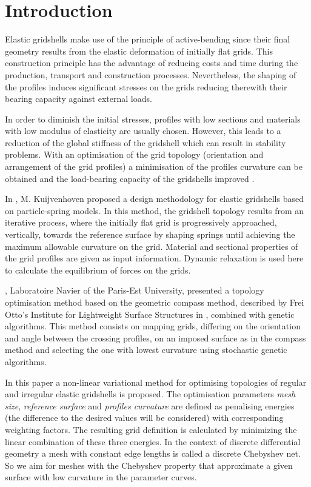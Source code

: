 
\section{Introduction}

Elastic gridshells make use of the principle of active-bending \cite{Alpermann2012} since their final geometry results from the elastic deformation of initially flat grids. This construction principle has the advantage of reducing costs and time during the production, transport and construction processes. Nevertheless, the shaping of the profiles induces significant stresses on the grids reducing therewith their bearing capacity against external loads.  

In order to diminish the initial stresses, profiles with low sections and materials with low modulus of elasticity are usually chosen. However, this leads to a reduction of the global stiffness of the gridshell which can result in stability problems. With an optimisation of the grid topology (orientation and arrangement of the grid profiles) a minimisation of the profiles curvature can be obtained and the load-bearing capacity of the gridshells improved \cite{Henandez2011}.  

In \cite{Kuijvenhoven2009}, M. Kuijvenhoven proposed a design methodology for elastic gridshells based on particle-spring models. In this method, the gridshell topology results from an iterative process, where the initially flat grid is progressively approached, vertically, towards the reference surface by shaping springs until achieving the maximum allowable curvature on the grid. Material and sectional properties of the grid profiles are given as input information. Dynamic relaxation is used here to calculate the equilibrium of forces on the grids. 

\cite{Bouhaya2011}, Laboratoire Navier of the Paris-Est University, presented a topology optimisation method based on the geometric compass method, described by Frei Otto's Institute for Lightweight Surface Structures in \cite{IL1974}, combined with genetic algorithms. This method consists on mapping grids, differing on the orientation and angle between the crossing profiles, on an imposed surface as in the compass method and selecting the one with lowest curvature using stochastic genetic algorithms.

In this paper a non-linear variational method for optimising topologies of regular and irregular elastic gridshells is proposed. The optimisation parameters {\it mesh size}, {\it reference surface} and {\it profiles curvature} are defined as penalising energies (the difference to the desired values will be considered) with corresponding weighting factors. The resulting grid definition is calculated by minimizing the linear combination of these three energies. In the context of discrete differential geometry a mesh with constant edge lengths is called a discrete Chebyshev net. So we aim for meshes with the Chebyshev property that approximate a given surface with low curvature in the parameter curves. 

